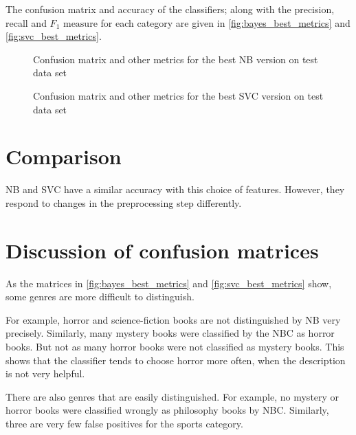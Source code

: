 The confusion matrix and accuracy of the classifiers; along with the precision, recall and $F_1\text{ measure}$ for each category are given in \autoref{fig:bayes_best_metrics} and \autoref{fig:svc_best_metrics}.


\begin{figure}[htpb]
    \caption{Confusion matrix and other metrics for the best NB version on test data set}
    \label{fig:bayes_best_metrics}
    \begin{tcolorbox}[title=NB - Bag of words]
        
    \end{tcolorbox}
\end{figure}

\begin{figure}[htpb]
    \caption{Confusion matrix and other metrics for the best SVC version on test data set}
    \label{fig:svc_best_metrics}
    \begin{tcolorbox}[title=SVC - Bag of words]
        
    \end{tcolorbox}
\end{figure}

\section{Comparison}

NB and SVC have a similar accuracy with this choice of features. However, they respond to changes in the preprocessing step differently.

\section{Discussion of confusion matrices}

As the matrices in \autoref{fig:bayes_best_metrics} and \autoref{fig:svc_best_metrics} show, some genres are more difficult to distinguish.

For example, horror and science-fiction books are not distinguished by NB very precisely. Similarly, many mystery books were classified by the NBC as horror books. But not as many horror books were not classified as mystery books. This shows that the classifier tends to choose horror more often, when the description is not very helpful.

There are also genres that are easily distinguished. For example, no mystery or horror books were classified wrongly as philosophy books by NBC. Similarly, three are very few false positives for the sports category.

